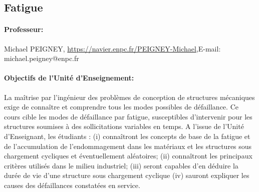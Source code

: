 \subsection{Fatigue}

\paragraph{Professeur:} 
Michael PEIGNEY, \url{https://navier.enpc.fr/PEIGNEY-Michael},\newline E-mail: michael.peigney@enpc.fr


\paragraph{Objectifs de l'Unité d'Enseignement:}
La maîtrise par l’ingénieur des problèmes de conception de structures mécaniques exige de connaître et comprendre tous les modes possibles de défaillance. Ce cours cible les modes de défaillance par fatigue, susceptibles d’intervenir pour les structures soumises à des sollicitations variables en temps.
A l’issue de l’Unité d’Enseignant, les étudiants :
(i) connaîtront les concepts de base de la fatigue et de l’accumulation de l’endommagement dans les matériaux et les structures sous chargement cycliques et éventuellement aléatoires;
(ii)	connaîtront les principaux critères utilisés dans le milieu industriel; (iii)	seront capables d’en déduire la durée de vie d’une structure sous  chargement cyclique  
(iv)	sauront expliquer les causes des défaillances constatées en service.




